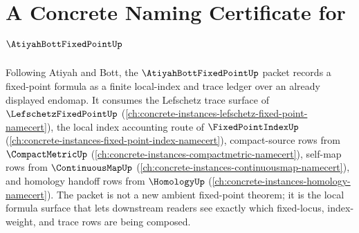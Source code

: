 \chapter{A Concrete Naming Certificate for $\AtiyahBottFixedPointUp$}
\label{ch:concrete-instances-atiyah-bott-fixed-point-namecert}

Following Atiyah and Bott, the $\AtiyahBottFixedPointUp$ packet records a fixed-point formula as a finite local-index and trace ledger over an already displayed endomap. It consumes the Lefschetz trace surface of $\LefschetzFixedPointUp$ (\autoref{ch:concrete-instances-lefschetz-fixed-point-namecert}), the local index accounting route of $\FixedPointIndexUp$ (\autoref{ch:concrete-instances-fixed-point-index-namecert}), compact-source rows from $\CompactMetricUp$ (\autoref{ch:concrete-instances-compactmetric-namecert}), self-map rows from $\ContinuousMapUp$ (\autoref{ch:concrete-instances-continuousmap-namecert}), and homology handoff rows from $\HomologyUp$ (\autoref{ch:concrete-instances-homology-namecert}). The packet is not a new ambient fixed-point theorem; it is the local formula surface that lets downstream readers see exactly which fixed-locus, index-weight, and trace rows are being composed.

